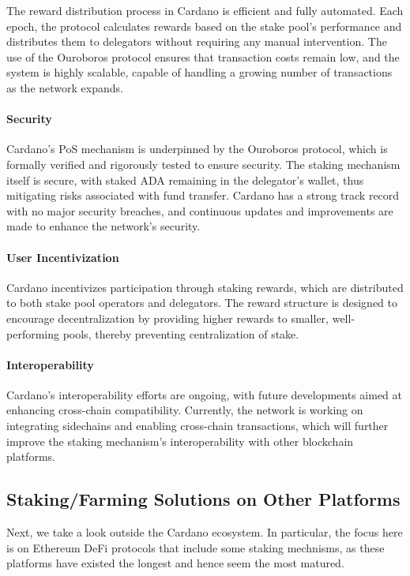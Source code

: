 \documentclass[12pt,parskip=full, tikz]{article}
\begin{document}
The reward distribution process in Cardano is efficient and fully automated. Each epoch, the protocol calculates rewards based on the stake pool's performance and distributes them to delegators without requiring any manual intervention. The use of the Ouroboros protocol ensures that transaction costs remain low, and the system is highly scalable, capable of handling a growing number of transactions as the network expands.

\paragraph{Security}

Cardano’s PoS mechanism is underpinned by the Ouroboros protocol, which is formally verified and rigorously tested to ensure security. The staking mechanism itself is secure, with staked ADA remaining in the delegator's wallet, thus mitigating risks associated with fund transfer. Cardano has a strong track record with no major security breaches, and continuous updates and improvements are made to enhance the network's security.

\paragraph{User Incentivization}

Cardano incentivizes participation through staking rewards, which are distributed to both stake pool operators and delegators. The reward structure is designed to encourage decentralization by providing higher rewards to smaller, well-performing pools, thereby preventing centralization of stake.

\paragraph{Interoperability}

Cardano's interoperability efforts are ongoing, with future developments aimed at enhancing cross-chain compatibility. Currently, the network is working on integrating sidechains and enabling cross-chain transactions, which will further improve the staking mechanism's interoperability with other blockchain platforms.





\subsection{Staking/Farming Solutions on Other Platforms}
Next, we take a look outside the Cardano ecosystem. In particular, the focus here is on Ethereum DeFi protocols that include some staking mechnisms, as these platforms have existed the longest and hence seem the most matured.
\end{document}
